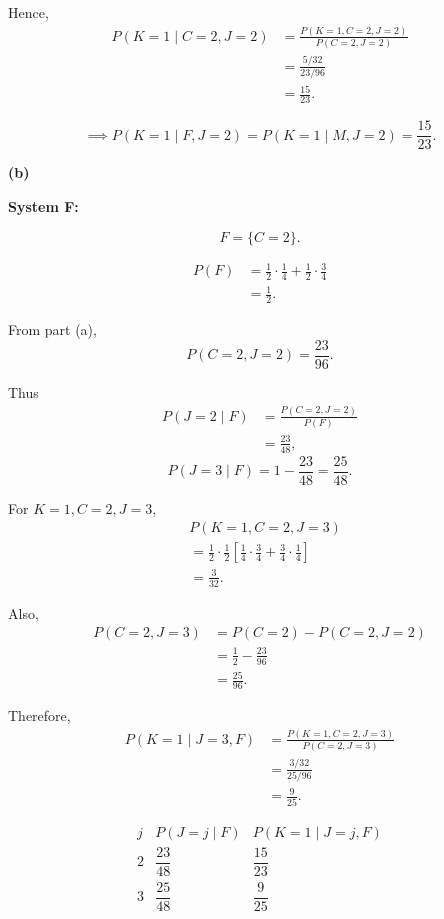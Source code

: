 \documentclass[11pt,a4paper]{article}
\newcommand{\Prob}{P}
\begin{document}
Hence,
\[
\begin{aligned}
\Prob(K=1\mid C=2,J=2)
&=\frac{\Prob(K=1,C=2,J=2)}
{\Prob(C=2,J=2)}\\
&=\frac{5/32}{23/96}\\
&=\frac{15}{23}.
\end{aligned}
\]

\[
\implies
\Prob(K=1\mid F,J=2)
=
\Prob(K=1\mid M,J=2)
=
\frac{15}{23}.
\]

\medskip
\noindent\textbf{(b)}

\textbf{System F:}

\[
F=\{C=2\}.
\]

\[
\begin{aligned}
\Prob(F)
&=\frac12\cdot\frac14+
\frac12\cdot\frac34\\
&=\frac12.
\end{aligned}
\]

From part (a),
\[
\Prob(C=2,J=2)=\frac{23}{96}.
\]

Thus
\[
\begin{aligned}
\Prob(J=2\mid F)
&=\frac{\Prob(C=2,J=2)}{\Prob(F)}\\
&=\frac{23}{48},
\end{aligned}
\]
\[
\Prob(J=3\mid F)
=1-\frac{23}{48}
=\frac{25}{48}.
\]

For $K=1,C=2,J=3$,
\[
\begin{aligned}
&\Prob(K=1,C=2,J=3)\\
&=\frac12\cdot\frac12
\left[
\frac14\cdot\frac34+
\frac34\cdot\frac14
\right]\\
&=\frac3{32}.
\end{aligned}
\]

Also,
\[
\begin{aligned}
\Prob(C=2,J=3)
&=\Prob(C=2)-\Prob(C=2,J=2)\\
&=\frac12-\frac{23}{96}\\
&=\frac{25}{96}.
\end{aligned}
\]

Therefore,
\[
\begin{aligned}
\Prob(K=1\mid J=3,F)
&=\frac{\Prob(K=1,C=2,J=3)}
{\Prob(C=2,J=3)}\\
&=\frac{3/32}{25/96}\\
&=\frac9{25}.
\end{aligned}
\]

\[
\begin{array}{c|cc}
j & \Prob(J=j\mid F)
& \Prob(K=1\mid J=j,F)\\
\hline
2 & \dfrac{23}{48} & \dfrac{15}{23}\\[6pt]
3 & \dfrac{25}{48} & \dfrac9{25}
\end{array}
\]
\end{document}
